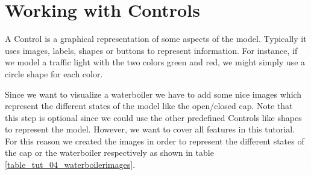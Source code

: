 \section{Working with Controls}
\label{tutorial_04}

A Control is a graphical representation of some aspects of the model. Typically it uses images, labels, shapes or buttons to represent information. For instance, if we model a traffic light with the two colors green and red, we might simply use a circle shape for each color.

Since we want to visualize a waterboiler we have to add some nice images which represent the different states of the model like the open/closed cap. Note that this step is optional since we could use the other predefined Controls like shapes to represent the model. However, we want to cover all features in this tutorial. For this reason we created the images in order to represent the different states of the cap or the waterboiler respectively as shown in table \ref{table_tut_04_waterboilerimages}.

